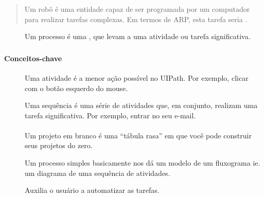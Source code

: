 \documentclass[letterpaper,10pt,brazil]{sphinxmanual}
\begin{document}
\begin{quote}

Um robô é uma entidade capaz de ser programada por um computador para realizar tarefas complexas. Em termos de ARP, esta tarefa seria .
\end{quote}
\begin{description}
\item[{}] \leavevmode
Um processo é uma , que levam a uma atividade ou tarefa significativa.

\end{description}


\subsubsection{}
\label{\detokenize{interface_guide:ii-comecando-no-uipath}}

\paragraph{Conceitos-chave}
\label{\detokenize{interface_guide:conceitos-chave}}\begin{description}
\item[{}] \leavevmode
Uma atividade é a menor ação possível no UIPath. Por exemplo, clicar com o botão esquerdo do mouse.

\item[{}] \leavevmode
Uma sequência é uma série de atividades que, em conjunto, realizam uma tarefa significativa. Por exemplo, entrar no seu e-mail.

\end{description}


\paragraph{}
\label{\detokenize{interface_guide:tipos-de-projetos}}\begin{description}
\item[{}] \leavevmode
Um projeto em branco é uma “tábula rasa” em que você pode construir seus projetos do zero.

\item[{}] \leavevmode
Um processo simples basicamente nos dá um modelo de um fluxograma ie. um diagrama de uma sequência de atividades.

\item[{}] \leavevmode
Auxilia o usuário a automatizar as tarefas.

\end{description}
\end{document}
